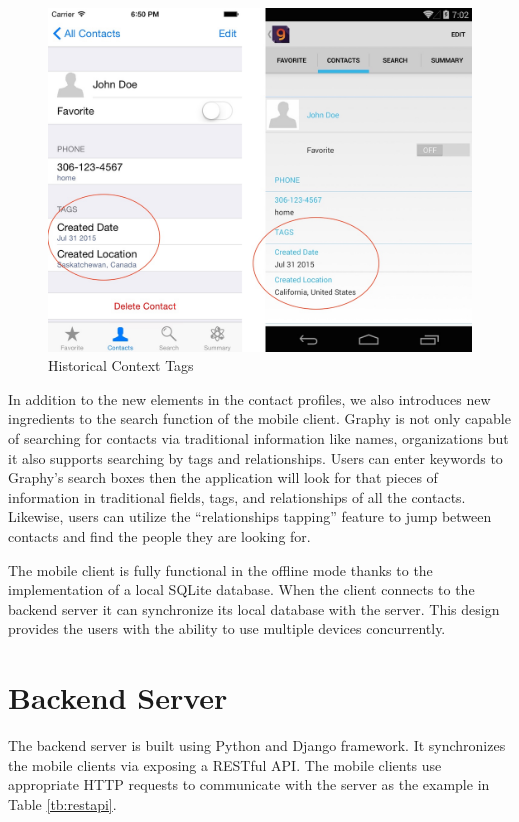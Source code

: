 \begin{figure}[!h]
\begin{centering}
\includegraphics[scale=0.3]{pics/graphy_auto_tag.png}
\caption{Historical Context Tags}\label{fg:/graphy_auto_tag}
\end{centering}
\end{figure}

In addition to the new elements in the contact profiles, we also introduces new ingredients to the search function of the mobile client. Graphy is not only capable of searching for contacts via traditional information like names, organizations but it also supports searching by tags and relationships. Users can enter keywords to Graphy's search boxes then the application will look for that pieces of information in traditional fields, tags, and relationships of all the contacts. Likewise, users can utilize the ``relationships tapping'' feature to jump between contacts and find the people they are looking for. 

The mobile client is fully functional in the offline mode thanks to the implementation of a local SQLite database. When the client connects to the backend server it can synchronize its local database with the server. This design provides the users with the ability to use multiple devices concurrently.

\section{Backend Server}
The backend server is built using Python and Django framework. It synchronizes the mobile clients via exposing a RESTful API. The mobile clients use appropriate HTTP requests to communicate with the server as the example in Table \ref{tb:restapi}.

